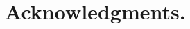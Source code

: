 \documentclass[moor]{informs1}              %
\begin{document}
%


%
%
%


\section*{Acknowledgments.}



\end{document}
